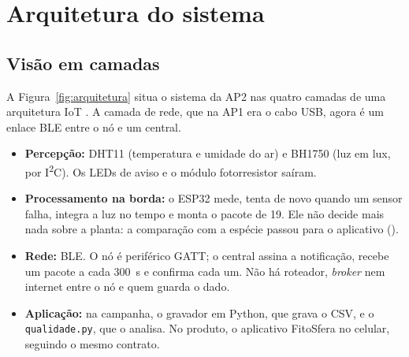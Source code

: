 \chapter{Arquitetura do sistema}
\label{cap:arquitetura}
\rubricaJustificativa

\section{Visão em camadas}

A Figura~\ref{fig:arquitetura} situa o sistema da AP2 nas quatro camadas
de uma arquitetura IoT \cite{alfuqaha2015}. A camada de rede, que na AP1
era o cabo USB, agora é um enlace BLE entre o nó e um central.

\begin{itemize}
  \item \textbf{Percepção:} DHT11 (temperatura e umidade do ar) e BH1750
    (luz em lux, por I\textsuperscript{2}C). Os LEDs de aviso e o módulo
    fotorresistor saíram.
  \item \textbf{Processamento na borda:} o ESP32 mede, tenta de novo
    quando um sensor falha, integra a luz no tempo e monta o pacote de
    \SI{19}{\byte}. Ele não decide mais nada sobre a planta: a comparação
    com a espécie passou para o aplicativo ().
  \item \textbf{Rede:} BLE. O nó é periférico GATT; o central assina a
    notificação, recebe um pacote a cada \SI{300}{\second} e confirma
    cada um. Não há roteador, \emph{broker} nem internet entre o nó e
    quem guarda o dado.
  \item \textbf{Aplicação:} na campanha, o gravador em Python, que grava
    o CSV, e o \texttt{qualidade.py}, que o analisa. No produto, o
    aplicativo FitoSfera no celular, seguindo o mesmo contrato.
\end{itemize}

